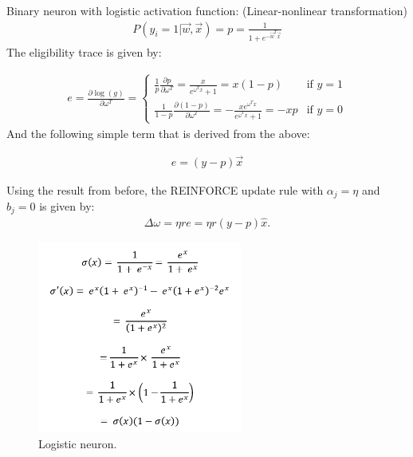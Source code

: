 \documentclass[11pt]{book} %
\begin{document}
\medbreak

Binary neuron with logistic activation function: (Linear-nonlinear transformation)
\begin{align*}
    P(y_i = 1 | \vec{w}, \vec{x}) = p = \frac{1}{1 + e^{-\vec{w}^T \vec{x}}}
\end{align*}
The eligibility trace is given by:

\begin{align*}
    e = \frac{\partial \log(g)}{\partial \omega^T} = 
    \begin{cases} 
    \frac{1}{p} \frac{\partial p}{\partial \omega^T} = \frac{x}{e^{\omega^Tx} + 1} = x(1 - p) & \text{if } y = 1 \\
    \frac{1}{1-p} \frac{\partial (1-p)}{\partial \omega^T} = -\frac{xe^{\omega^Tx}}{e^{\omega^Tx} + 1} = -xp & \text{if } y = 0 
    \end{cases}
\end{align*}
And the following simple term that is derived from the above:

\begin{align*}
    e = (y - p)\vec{x}
\end{align*}

Using the result from before, the REINFORCE update rule with $\alpha_j = \eta$ and $b_j = 0$ is given by:
\begin{align*}
    \Delta\omega = \eta r e = \eta r (y - p) \hat{x}.
\end{align*}

\begin{figure}[ht]
    \centering
    \includegraphics[width=0.6\textwidth]{./Figs/sigmoid_function_derivative.png}
    \caption{Logistic neuron.}
    \label{fig:logistic_neuron}
\end{figure}
\end{document}
